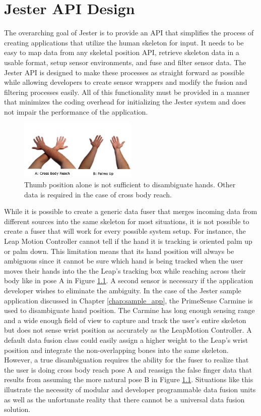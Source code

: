 \chapter{Jester API Design}\label{chap:api_des}

The overarching goal of Jester is to provide an API that simplifies the process of creating applications that utilize the human skeleton for input. It needs to be easy to map data from any skeletal position API, retrieve skeleton data in a usable format, setup sensor environments, and fuse and filter sensor data. The Jester API is designed to make these processes as straight forward as possible while allowing developers to create sensor wrappers and modify the fusion and filtering processes easily. All of this functionality must be provided in a manner that minimizes the coding overhead for initializing the Jester system and does not impair the performance of the application.

\begin{figure}[]
\centering
\includegraphics[width=0.5\textwidth]{figures/handAmbig}
\caption{Thumb position alone is not sufficient to disambiguate hands. Other data is required in the case of cross body reach.}
\label{fig:hand_cross}
\end{figure}

While it is possible to create a generic data fuser that merges incoming data from different sources into the same skeleton for most situations, it is not possible to create a fuser that will work for every possible system setup. For instance, the Leap Motion Controller cannot tell if the hand it is tracking is oriented palm up or palm down. This limitation means that its hand position will always be ambiguous since it cannot be sure which hand is being tracked when the user moves their hands into the the Leap's tracking box while reaching across their body like in pose A in Figure \ref{fig:hand_cross}. A second sensor is necessary if the application developer wishes to eliminate the ambiguity. In the case of the Jester sample application discussed in Chapter \ref{chap:sample_app}, the PrimeSense Carmine is used to disambiguate hand position. The Carmine has long enough sensing range and a wide enough field of view to capture and track the user's entire skeleton but does not sense wrist position as accurately as the LeapMotion Controller. A default data fusion class could easily assign a higher weight to the Leap's wrist position and integrate the non-overlapping bones into the same skeleton. However, a true disambiguation requires the ability for the fuser to realize that the user is doing cross body reach pose A and reassign the false finger data that results from assuming the more natural pose B in Figure \ref{fig:hand_cross}. Situations like this illustrate the necessity of modular and developer programmable data fusion units as well as the unfortunate reality that there cannot be a universal data fusion solution.

